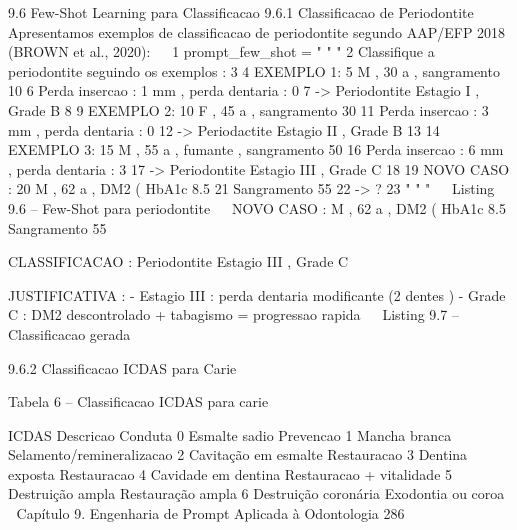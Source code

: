   9.6     Few-Shot Learning para Classificacao
  9.6.1    Classificacao de Periodontite
  Apresentamos exemplos de classificacao de periodontite segundo AAP/EFP 2018
  (BROWN et al., 2020):
                                                                                      
 1 prompt_few_shot = " " "
 2 Classifique a periodontite seguindo os exemplos :
 3
 4 EXEMPLO 1:
 5 M , 30 a , sangramento 10%
 6 Perda insercao : 1 mm , perda dentaria : 0
 7 -> Periodontite Estagio I , Grade B
 8
 9 EXEMPLO 2:
10 F , 45 a , sangramento 30%
11 Perda insercao : 3 mm , perda dentaria : 0
12 -> Periodactite Estagio II , Grade B
13
14 EXEMPLO 3:
15 M , 55 a , fumante , sangramento 50%
16 Perda insercao : 6 mm , perda dentaria : 3
17 -> Periodontite Estagio III , Grade C
18
19 NOVO CASO :
20 M , 62 a , DM2 ( HbA1c 8.5%
21 Sangramento 55%
22 -> ?
23 " " "
                                                                                      
                           Listing 9.6 – Few-Shot para periodontite
                                                                                      
  NOVO CASO :
  M , 62 a , DM2 ( HbA1c 8.5%
  Sangramento 55%

  CLASSIFICACAO : Periodontite Estagio III , Grade C

  JUSTIFICATIVA :
  - Estagio III : perda dentaria modificante (2 dentes )
  - Grade C : DM2 descontrolado + tabagismo = progressao rapida
                                                                                      
                               Listing 9.7 – Classificacao gerada


  9.6.2    Classificacao ICDAS para Carie

                          Tabela 6 – Classificacao ICDAS para carie

                  ICDAS     Descricao                Conduta
                  0         Esmalte sadio            Prevencao
                  1         Mancha branca            Selamento/remineralizacao
                  2         Cavitação em esmalte     Restauracao
                  3         Dentina exposta          Restauracao
                  4         Cavidade em dentina      Restauracao + vitalidade
                  5         Destruição ampla         Restauração ampla
                  6         Destruição coronária     Exodontia ou coroa
  Capítulo 9. Engenharia de Prompt Aplicada à Odontologia                 286


